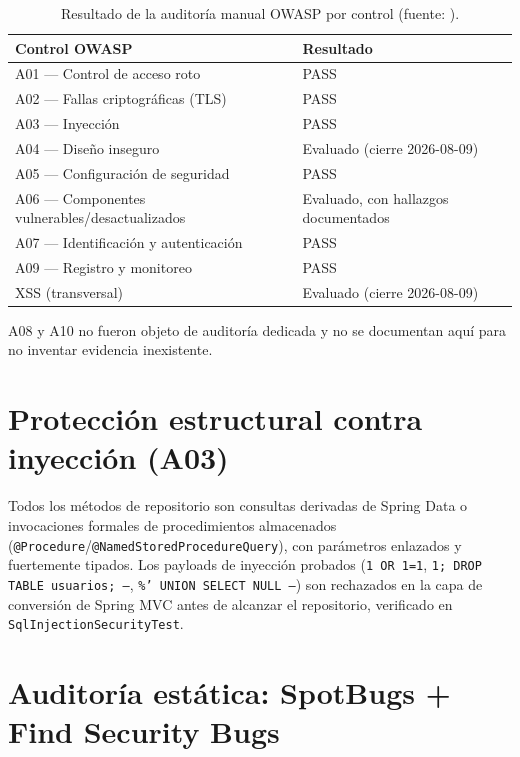 \begin{table}[H]
  \centering
  \caption{Resultado de la auditor\'ia manual OWASP por control (fuente: ).}
  \label{tab:owasp-final}
  \begin{tabular}{@{}p{7.5cm}p{6.5cm}@{}}
    \toprule
    Control OWASP & Resultado \\
    \midrule
    A01 --- Control de acceso roto & PASS \\
    A02 --- Fallas criptogr\'aficas (TLS) & PASS \\
    A03 --- Inyecci\'on & PASS \\
    A04 --- Dise\~no inseguro & Evaluado (cierre 2026-08-09) \\
    A05 --- Configuraci\'on de seguridad & PASS \\
    A06 --- Componentes vulnerables/desactualizados & Evaluado, con hallazgos documentados \\
    A07 --- Identificaci\'on y autenticaci\'on & PASS \\
    A09 --- Registro y monitoreo & PASS \\
    XSS (transversal) & Evaluado (cierre 2026-08-09) \\
    \bottomrule
  \end{tabular}
\end{table}

A08 y A10 no fueron objeto de auditor\'ia dedicada y no se documentan aqu\'i
para no inventar evidencia inexistente.

\section{Protecci\'on estructural contra inyecci\'on (A03)}

Todos los m\'etodos de repositorio son consultas derivadas de Spring Data o
invocaciones formales de procedimientos almacenados
(\texttt{@Procedure}/\texttt{@NamedStoredProcedureQuery}), con par\'ametros
enlazados y fuertemente tipados. Los payloads de inyecci\'on probados
(\texttt{1 OR 1=1}, \texttt{1; DROP TABLE usuarios; --}, \texttt{\%' UNION
SELECT NULL --}) son rechazados en la capa de conversi\'on de Spring MVC
antes de alcanzar el repositorio, verificado en \texttt{SqlInjectionSecurityTest}.

\section{Auditor\'ia est\'atica: SpotBugs + Find Security Bugs}
\label{sec:spotbugs}

